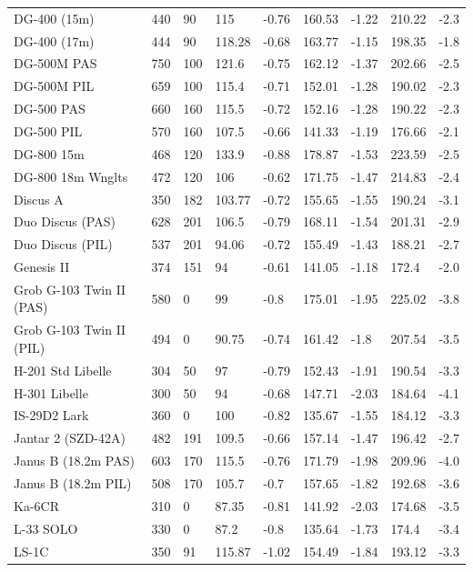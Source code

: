 \documentclass[a4paper,12pt]{refrep}
\begin{document}
\begin{maxipage}
\begin{small}
\begin{longtable}{l l l l l l l l l}
DG-400 (15m) & 440 & 90 & 115 & -0.76 & 160.53 & -1.22 & 210.22 & -2.3 \\
DG-400 (17m) & 444 & 90 & 118.28 & -0.68 & 163.77 & -1.15 & 198.35 & -1.8 \\
DG-500M PAS & 750 & 100 & 121.6 & -0.75 & 162.12 & -1.37 & 202.66 & -2.5 \\
DG-500M PIL & 659 & 100 & 115.4 & -0.71 & 152.01 & -1.28 & 190.02 & -2.3 \\
DG-500 PAS & 660 & 160 & 115.5 & -0.72 & 152.16 & -1.28 & 190.22 & -2.3 \\
DG-500 PIL & 570 & 160 & 107.5 & -0.66 & 141.33 & -1.19 & 176.66 & -2.1 \\
DG-800 15m & 468 & 120 & 133.9 & -0.88 & 178.87 & -1.53 & 223.59 & -2.5 \\
DG-800 18m Wnglts & 472 & 120 & 106 & -0.62 & 171.75 & -1.47 & 214.83 & -2.4 \\
Discus A & 350 & 182 & 103.77 & -0.72 & 155.65 & -1.55 & 190.24 & -3.1 \\
Duo Discus (PAS) & 628 & 201 & 106.5 & -0.79 & 168.11 & -1.54 & 201.31 & -2.9 \\
Duo Discus (PIL) & 537 & 201 & 94.06 & -0.72 & 155.49 & -1.43 & 188.21 & -2.7 \\
Genesis II & 374 & 151 & 94 & -0.61 & 141.05 & -1.18 & 172.4 & -2.0 \\
Grob G-103 Twin II (PAS) & 580 & 0 & 99 & -0.8 & 175.01 & -1.95 & 225.02 & -3.8 \\
Grob G-103 Twin II (PIL) & 494 & 0 & 90.75 & -0.74 & 161.42 & -1.8 & 207.54 & -3.5 \\
H-201 Std Libelle & 304 & 50 & 97 & -0.79 & 152.43 & -1.91 & 190.54 & -3.3 \\
H-301 Libelle & 300 & 50 & 94 & -0.68 & 147.71 & -2.03 & 184.64 & -4.1 \\
IS-29D2 Lark & 360 & 0 & 100 & -0.82 & 135.67 & -1.55 & 184.12 & -3.3 \\
Jantar 2 (SZD-42A) & 482 & 191 & 109.5 & -0.66 & 157.14 & -1.47 & 196.42 & -2.7 \\
Janus B (18.2m PAS) & 603 & 170 & 115.5 & -0.76 & 171.79 & -1.98 & 209.96 & -4.0 \\
Janus B (18.2m PIL) & 508 & 170 & 105.7 & -0.7 & 157.65 & -1.82 & 192.68 & -3.6 \\
Ka-6CR & 310 & 0 & 87.35 & -0.81 & 141.92 & -2.03 & 174.68 & -3.5 \\
L-33 SOLO & 330 & 0 & 87.2 & -0.8 & 135.64 & -1.73 & 174.4 & -3.4 \\
LS-1C & 350 & 91 & 115.87 & -1.02 & 154.49 & -1.84 & 193.12 & -3.3 \\
\bottomrule
\end{longtable}
\end{small}
\end{maxipage}
\end{document}
